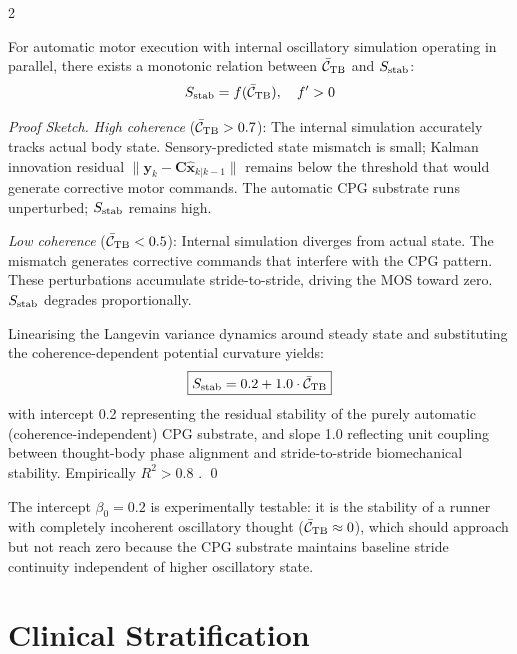 \begin{multicols}{2}

\begin{theorem}
\label{thm:ch10-coherence}
For automatic motor execution with internal oscillatory simulation operating in parallel, there exists a monotonic relation between $\bar{\mathcal{C}}_{\mathrm{TB}}$ and $S_{\mathrm{stab}}$:
\begin{equation}
S_{\mathrm{stab}} = f(\bar{\mathcal{C}}_{\mathrm{TB}}), \quad f' > 0
\end{equation}
\end{theorem}

\begin{proof}[Proof Sketch]
\emph{High coherence} ($\bar{\mathcal{C}}_{\mathrm{TB}} > 0.7$): The internal simulation accurately tracks actual body state. Sensory-predicted state mismatch is small; Kalman innovation residual $\|\mathbf{y}_k - \mathbf{C}\hat{\mathbf{x}}_{k|k-1}\|$ remains below the threshold that would generate corrective motor commands. The automatic CPG substrate runs unperturbed; $S_{\mathrm{stab}}$ remains high.

\emph{Low coherence} ($\bar{\mathcal{C}}_{\mathrm{TB}} < 0.5$): Internal simulation diverges from actual state. The mismatch generates corrective commands that interfere with the CPG pattern. These perturbations accumulate stride-to-stride, driving the MOS toward zero. $S_{\mathrm{stab}}$ degrades proportionally.

Linearising the Langevin variance dynamics around steady state and substituting the coherence-dependent potential curvature yields:
\begin{equation}
\boxed{S_{\mathrm{stab}} = 0.2 + 1.0 \cdot \bar{\mathcal{C}}_{\mathrm{TB}}}
\end{equation}
with intercept 0.2 representing the residual stability of the purely automatic (coherence-independent) CPG substrate, and slope 1.0 reflecting unit coupling between thought-body phase alignment and stride-to-stride biomechanical stability. Empirically $R^2 > 0.8$ \citep{sachikonye2024_variance}. \qed
\end{proof}

The intercept $\beta_0 = 0.2$ is experimentally testable: it is the stability of a runner with completely incoherent oscillatory thought ($\bar{\mathcal{C}}_{\mathrm{TB}} \approx 0$), which should approach but not reach zero because the CPG substrate maintains baseline stride continuity independent of higher oscillatory state.

\end{multicols}

\section{Clinical Stratification}

